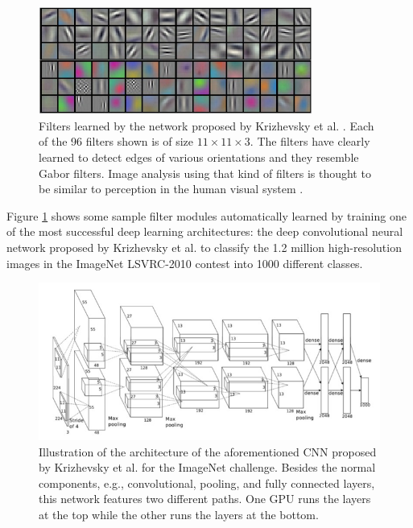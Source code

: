 \begin{figure}[!b]
	\centering
	\includegraphics[width=0.8\textwidth]{Figures/ObjRecog/weights}
	\caption{Filters learned by the network proposed by Krizhevsky et al. \cite{Krizhevsky2012}. Each of the 96 filters shown is of size $11\times11\times3$. The filters have clearly learned to detect edges of various orientations and they resemble Gabor filters. Image analysis using that kind of filters is thought to be similar to perception in the human visual system \cite{Marvcelja1980}.}
	\label{fig:alexnet_weights}
\end{figure}

Figure \ref{fig:alexnet_weights} shows some sample filter modules automatically learned by training one of the most successful deep learning architectures: the deep convolutional neural network proposed by Krizhevsky et al. \cite{Krizhevsky2012} to classify the \num{1.2} million high-resolution images in the ImageNet LSVRC-2010 \cite{Berg2010} contest into \num{1000} different classes.

\begin{figure}[!b]
	\centering
    \includegraphics[width=\linewidth]{Figures/ObjRecog/alexnet}
	\caption{Illustration of the architecture of the aforementioned \acs{CNN} proposed by Krizhevsky et al.\cite{Krizhevsky2012} for the ImageNet challenge. Besides the normal components, e.g., convolutional, pooling, and fully connected layers, this network features two different paths. One \ac{GPU} runs the layers at the top while the other runs the layers at the bottom.}
	\label{fig:convnet_architecture}
\end{figure}

